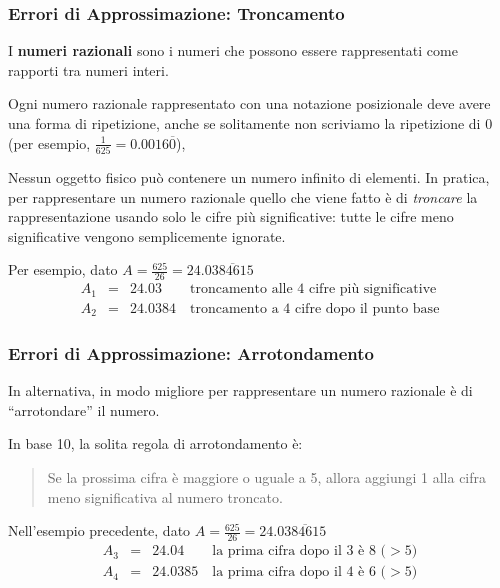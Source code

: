 \documentclass[xcolor={table}]{beamer}
\begin{document}
\begin{frame}
   \frametitle{Errori di Approssimazione: Troncamento}
   
	I {\bf numeri razionali} sono i numeri che possono essere rappresentati come rapporti tra numeri interi.
	
	\bigskip
	Ogni numero razionale rappresentato con una notazione posizionale deve avere una forma di ripetizione,
	anche se solitamente non scriviamo la ripetizione di 0 (per esempio, $\frac{1}{625}=0.0016\overline{0}$),
	
	\bigskip
	Nessun oggetto fisico può contenere un numero infinito di elementi. 
	In pratica, per rappresentare un numero razionale quello che viene fatto è di {\it troncare}
	la rappresentazione usando solo le cifre più significative: tutte le cifre meno significative vengono semplicemente ignorate.
	
	\bigskip
	Per esempio, dato $A=\frac{625}{26} = 24.0\overline{384615}$
	\begin{eqnarray*}
	A_1 &=& 24.03  \quad\quad\mbox{troncamento alle 4 cifre più significative} \\
	A_2 &=& 24.0384 \quad \mbox{troncamento a 4 cifre dopo il punto base}
	\end{eqnarray*}
\end{frame}

\begin{frame}
   \frametitle{Errori di Approssimazione: Arrotondamento}

	In alternativa, in modo migliore per rappresentare un numero razionale è di ``arrotondare'' il numero.
	
	\bigskip
	In base 10, la solita regola di arrotondamento è: 
	
	\begin{quote}
	Se la prossima cifra è maggiore o uguale a 5, allora aggiungi 1 alla cifra meno significativa al numero troncato.
	\end{quote}
	
	\bigskip
	Nell'esempio precedente, dato $A=\frac{625}{26} = 24.0\overline{384615}$
	\begin{eqnarray*}
	A_3 &=& 24.04  \quad\quad \mbox{la prima cifra dopo il 3 è 8 ($>5$)} \\
	A_4 &=& 24.0385 \quad  \mbox{la prima cifra dopo il 4 è 6 ($>5$)}
	\end{eqnarray*}
	
	
\end{frame}
\end{document}
